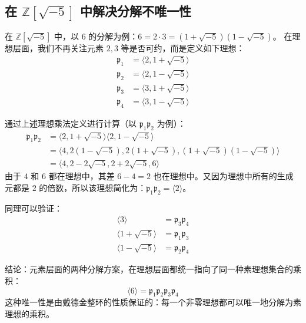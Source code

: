 \documentclass[11pt]{article}
\begin{document}
\subsection{在 $\mathbb{Z}[\sqrt{-5}]$ 中解决分解不唯一性}
\begin{cnexample}
在 $\mathbb{Z}[\sqrt{-5}]$ 中，以 $6$ 的分解为例：$6 = 2 \cdot 3 = (1+\sqrt{-5})(1-\sqrt{-5})$。
在理想层面，我们不再关注元素 $2, 3$ 等是否可约，而是定义如下理想：
\begin{align*}
\mathfrak{p}_1 &= \langle 2, 1+\sqrt{-5} \rangle \\
\mathfrak{p}_2 &= \langle 2, 1-\sqrt{-5} \rangle \\
\mathfrak{p}_3 &= \langle 3, 1+\sqrt{-5} \rangle \\
\mathfrak{p}_4 &= \langle 3, 1-\sqrt{-5} \rangle
\end{align*}

通过上述理想乘法定义进行计算（以 $\mathfrak{p}_1 \mathfrak{p}_2$ 为例）：
\begin{equation*}
\begin{aligned}
\mathfrak{p}_1 \mathfrak{p}_2 &= \langle 2, 1+\sqrt{-5} \rangle \langle 2, 1-\sqrt{-5} \rangle \\
&= \langle 4, 2(1-\sqrt{-5}), 2(1+\sqrt{-5}), (1+\sqrt{-5})(1-\sqrt{-5}) \rangle \\
&= \langle 4, 2-2\sqrt{-5}, 2+2\sqrt{-5}, 6 \rangle
\end{aligned}
\end{equation*}
由于 $4$ 和 $6$ 都在理想中，其差 $6-4=2$ 也在理想中。又因为理想中所有的生成元都是 $2$ 的倍数，所以该理想简化为：$\mathfrak{p}_1 \mathfrak{p}_2 = \langle 2 \rangle$。

同理可以验证：
\begin{align*}
\langle 3 \rangle &= \mathfrak{p}_3 \mathfrak{p}_4 \\
\langle 1+\sqrt{-5} \rangle &= \mathfrak{p}_1 \mathfrak{p}_3 \\
\langle 1-\sqrt{-5} \rangle &= \mathfrak{p}_2 \mathfrak{p}_4
\end{align*}

结论：元素层面的两种分解方案，在理想层面都统一指向了同一种素理想集合的乘积：
$$ \langle 6 \rangle = \mathfrak{p}_1 \mathfrak{p}_2 \mathfrak{p}_3 \mathfrak{p}_4 $$
这种唯一性是由戴德金整环的性质保证的：每一个非零理想都可以唯一地分解为素理想的乘积。
\end{cnexample}
\end{document}
